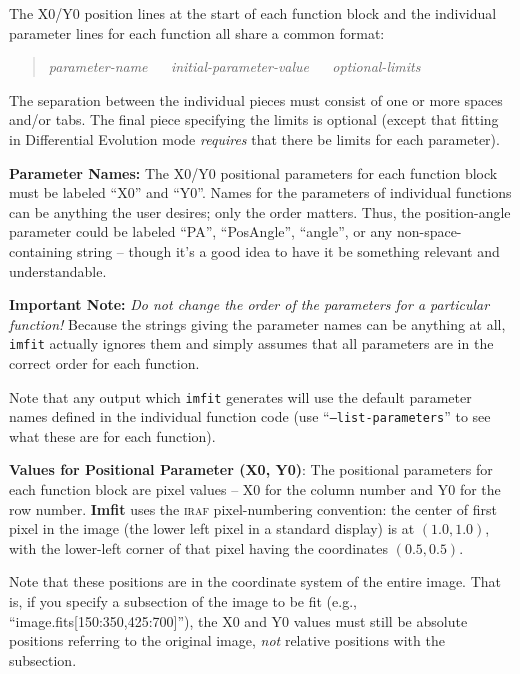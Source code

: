 \documentclass[10pt,a4paper,article]{memoir}
\newcommand{\Imfit}{\textbf{Imfit}}
\newcommand{\imfitprog}{\texttt{imfit}}
\begin{document}
The X0/Y0 position lines at the start of each function block and the
individual parameter lines for each function all share a common format:
\begin{quote}
\textit{parameter-name} ~~ \textit{initial-parameter-value} ~~ \textit{optional-limits}
\end{quote}
The separation between the individual pieces must consist of one or more spaces
and/or tabs. The final piece specifying the limits is optional (except that
fitting in Differential Evolution mode \textit{requires} that there be limits
for each parameter).

\bigskip

\textbf{Parameter Names:} The X0/Y0 positional parameters for each
function block must be labeled ``X0'' and ``Y0''. Names for the
parameters of individual functions can be anything the user desires;
only the order matters. Thus, the position-angle parameter could be
labeled ``PA'', ``PosAngle'', ``angle'', or any non-space-containing
string -- though it's a good idea to have it be something relevant
and understandable.

\textbf{Important Note:} \textit{Do not change the order of the parameters
for a particular function!}  Because the strings giving the parameter names
can be anything at all, \imfitprog{} actually ignores them and simply assumes
that all parameters are in the correct order for each function.

Note that any output which \imfitprog{} generates will use the default parameter
names defined in the individual function code (use ``\texttt{--list-parameters}''
to see what these are for each function).

\bigskip

\textbf{Values for Positional Parameter (X0, Y0)}: The positional parameters
for each function block are pixel values -- X0 for the column number and
Y0 for the row number. \Imfit{} uses the \textsc{iraf} pixel-numbering
convention: the center of first pixel in the image (the lower left pixel
in a standard display) is at $(1.0,1.0)$, with the lower-left corner of that
pixel having the coordinates $(0.5,0.5)$.

Note that these positions are in the coordinate system of the entire
image. That is, if you specify a subsection of the image to be fit
(e.g., ``image.fits[150:350,425:700]''), the X0 and Y0 values must still
be absolute positions referring to the original image, \textit{not} relative
positions with the subsection.


\bigskip
\end{document}
